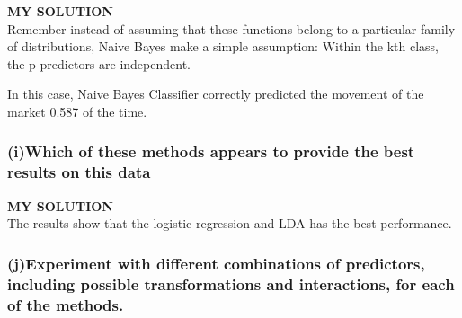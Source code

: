 \documentclass[
]{article}
\newenvironment{Shaded}{\begin{snugshade}}{\end{snugshade}}
\newcommand{\AttributeTok}[1]{\textcolor[rgb]{0.77,0.63,0.00}{#1}}
\newcommand{\DecValTok}[1]{\textcolor[rgb]{0.00,0.00,0.81}{#1}}
\newcommand{\FloatTok}[1]{\textcolor[rgb]{0.00,0.00,0.81}{#1}}
\newcommand{\FunctionTok}[1]{\textcolor[rgb]{0.00,0.00,0.00}{#1}}
\newcommand{\NormalTok}[1]{#1}
\newcommand{\OtherTok}[1]{\textcolor[rgb]{0.56,0.35,0.01}{#1}}
\newcommand{\SpecialCharTok}[1]{\textcolor[rgb]{0.00,0.00,0.00}{#1}}
\begin{document}
\textbf{MY SOLUTION}\\
Remember instead of assuming that these functions belong to a particular
family of distributions, Naive Bayes make a simple assumption: Within
the kth class, the p predictors are independent.

\begin{Shaded}
\end{Shaded}

In this case, Naive Bayes Classifier correctly predicted the movement of
the market 0.587 of the time.

\hypertarget{iwhich-of-these-methods-appears-to-provide-the-best-results-on-this-data}{%
\subsubsection{\texorpdfstring{\textbf{(i)Which of these methods appears
to provide the best results on this
data}}{(i)Which of these methods appears to provide the best results on this data}}\label{iwhich-of-these-methods-appears-to-provide-the-best-results-on-this-data}}

\textbf{MY SOLUTION}\\
The results show that the logistic regression and LDA has the best
performance.

\hypertarget{jexperiment-with-different-combinations-of-predictors-including-possible-transformations-and-interactions-for-each-of-the-methods.}{%
\subsubsection{\texorpdfstring{\textbf{(j)Experiment with different
combinations of predictors, including possible transformations and
interactions, for each of the methods.
}}{(j)Experiment with different combinations of predictors, including possible transformations and interactions, for each of the methods. }}\label{jexperiment-with-different-combinations-of-predictors-including-possible-transformations-and-interactions-for-each-of-the-methods.}}
\end{document}
